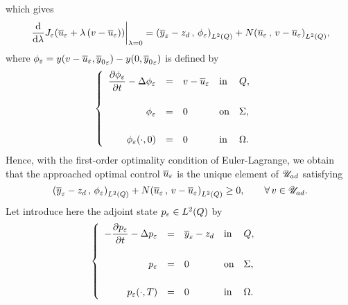 which gives
\begin{equation*}
    {\left.{%
        \dfrac{\diff}{\diff{\lambda}}J_{\veps}\!\left({%
            \bareps{u} + \lambda\left({v - \bareps{u}}\right)
        }\right)
    }\right|}_{\lambda = 0} = \scalaireq{%
        \bareps{y} - z_{d}
    }{%
        \fieps{}
    } + N\scalaireq{\bareps{u}}{v - \bareps{u}},
\end{equation*}
where ${\phi}_{\varepsilon} = y\!\left({v - {\overline{u}}_{\varepsilon}, {\overline{y}_{0}}_{\varepsilon}}\right) -
y\!\left({0, {\overline{y}_{0}}_{\varepsilon}}\right)$ is defined by
\begin{equation}\label{eq:control125}
    \begin{cases}\displaystyle
        \begin{array}{rclll}
            \dfrac{\partial{}{\phi}_{\varepsilon}}{\partial{}t} - \Delta{\phi}_{\varepsilon} & = & v - {\overline{u}}_{\varepsilon} &
            \text{in} & Q,\\
            \\
            {\phi}_{\varepsilon} & = & 0 & \text{on} & \Sigma,\\
            \\
            {{\phi}_{\varepsilon}}\!\left({\cdot, 0}\right) & = & 0 & \text{in} & \Omega.
        \end{array}
    \end{cases}
\end{equation}
Hence, with the first-order optimality condition of Euler-Lagrange, we
obtain that the approached optimal control ${\overline{u}}_{\varepsilon}$ is the unique
element of ${\mathscr{U}}_{ad}$ satisfying
\begin{equation}\label{eq:control126}
    \scalaireq{%
        \bareps{y} - z_{d}
    }{%
        \fieps{}
    } + N\scalaireq{%
        \bareps{u}
    }{%
        v - \bareps{u}
    } \geq 0,\qquad\forall\,v\in\uad.
\end{equation}
Let introduce here the adjoint state $p_{\varepsilon}\in L^{2}\!\left({Q}\right)$ by
\begin{equation*}
    \begin{cases}\displaystyle
        \begin{array}{rclll}
            -\dfrac{\partial{}p_{\varepsilon}}{\partial{}t} - \Delta p_{\varepsilon} & = & {\overline{y}}_{\varepsilon} -
            z_{d} & \text{in} & Q,\\
            \\
            p_{\varepsilon} & = & 0 & \text{on} & \Sigma,\\
            \\
            {p_{\varepsilon}}\!\left({\cdot,T}\right) & = & 0 & \text{in} & \Omega.
        \end{array}
    \end{cases}
\end{equation*}
